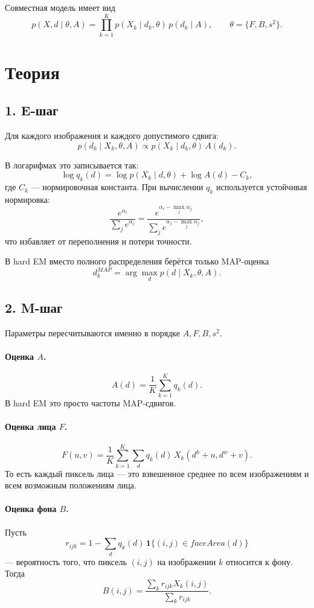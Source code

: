 \documentclass[12pt,a4paper]{article}
\begin{document}
Совместная модель имеет вид
\[
p(X,d \mid \theta, A) = \prod_{k=1}^{K} p(X_k \mid d_k,\theta)\, p(d_k \mid A),
\qquad
\theta = \{F,B,s^2\}.
\]

\section{Теория}

\subsection*{1. E-шаг}

Для каждого изображения и каждого допустимого сдвига:
\[
p(d_k \mid X_k,\theta,A) \propto p(X_k \mid d_k,\theta)\, A(d_k).
\]

В логарифмах это записывается так:
\[
\log q_k(d) = \log p(X_k \mid d,\theta) + \log A(d) - C_k,
\]
где $C_k$ --- нормировочная константа. При вычислении $q_k$ используется устойчивая нормировка:
\[
\frac{e^{\alpha_i}}{\sum_j e^{\alpha_j}}
=
\frac{e^{\alpha_i - \max_j \alpha_j}}{\sum_j e^{\alpha_j - \max_j \alpha_j}},
\]
что избавляет от переполнения и потери точности.

В hard EM вместо полного распределения берётся только MAP-оценка
\[
d_k^{MAP} = \arg\max_d p(d \mid X_k,\theta,A).
\]

\subsection*{2. M-шаг}

Параметры пересчитываются именно в порядке $A, F, B, s^2$.

\paragraph{Оценка $A$.}
\[
A(d) = \frac{1}{K}\sum_{k=1}^{K} q_k(d).
\]
В hard EM это просто частоты MAP-сдвигов.

\paragraph{Оценка лица $F$.}
\[
F(u,v) = \frac{1}{K} \sum_{k=1}^{K} \sum_d q_k(d)\, X_k(d^h + u, d^w + v).
\]
То есть каждый пиксель лица --- это взвешенное среднее по всем изображениям и всем возможным положениям лица.

\paragraph{Оценка фона $B$.}
Пусть
\[
r_{ijk} = 1 - \sum_d q_k(d)\, \mathbf{1}\{(i,j)\in faceArea(d)\}
\]
--- вероятность того, что пиксель $(i,j)$ на изображении $k$ относится к фону. Тогда
\[
B(i,j) = \frac{\sum_k r_{ijk}X_k(i,j)}{\sum_k r_{ijk}}.
\]
\end{document}
